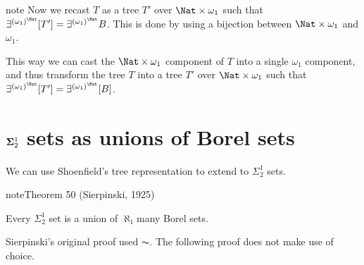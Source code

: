\documentclass[letterpaper,10pt,english]{jupyterBook}
\begin{document}
\begin{sphinxadmonition}{note}
\sphinxAtStartPar
Now we recast \(T\) as a tree \(T'\) over \(\Nat \times \omega_1\) such that \(\exists^{(\omega_1)^\Nat}[T'] = \exists^{(\omega_1)^\Nat} B\). This is done by using a bijection between \(\Nat \times \omega_1\) and \(\omega_1\).

\sphinxAtStartPar
This way we can cast the \(\Nat \times \omega_1\) component of \(T\) into a single \(\omega_1\) component, and thus transform the tree \(T\) into a tree \(T'\) over \(\Nat \times \omega_1\) such that \(\exists^{(\omega_1)^\Nat}[T'] = \exists^{(\omega_1)^\Nat}[B]\).
\end{sphinxadmonition}


\section{\protect\(\mathbf{\Sigma}^1_2\protect\) sets as unions of Borel sets}
\label{\detokenize{shoenfield:mathbf-sigma-1-2-sets-as-unions-of-borel-sets}}
\sphinxAtStartPar
We can use Shoenfield’s tree representation to extend {\hyperref[\detokenize{coanalytic:cor-coanal-union-Borel}]{}} to \(\Sigma^1_2\) sets.
\label{shoenfield:thm-sigma12-union-Borel}
\begin{sphinxadmonition}{note}{Theorem 50 (Sierpinski, 1925)}



\sphinxAtStartPar
Every \(\Sigma^1_2\) set is a union of \(\aleph_1\)\sphinxhyphen{}many Borel sets.
\end{sphinxadmonition}

\sphinxAtStartPar
Sierpinski’s original proof used \(\AC\). The following proof does not make use of choice.
\end{document}
